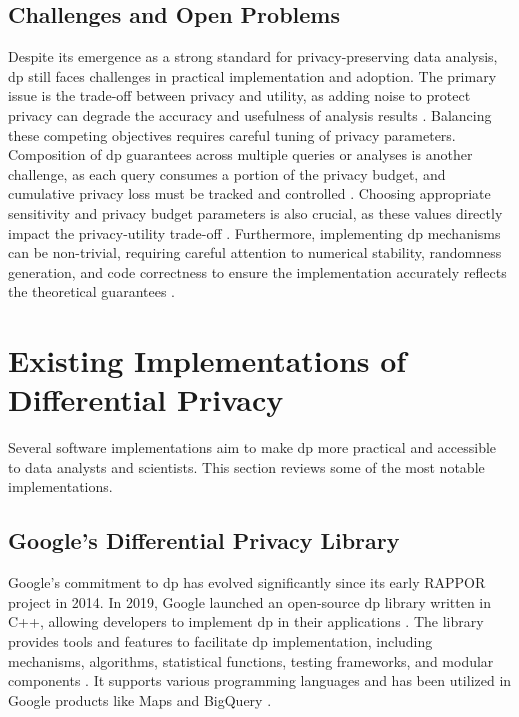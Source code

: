 \subsection{Challenges and Open Problems}
Despite its emergence as a strong standard for privacy-preserving data analysis, \acrshort{dp} still faces challenges in practical implementation and adoption. The primary issue is the trade-off between privacy and utility, as adding noise to protect privacy can degrade the accuracy and usefulness of analysis results \cite{Dwork2014}. Balancing these competing objectives requires careful tuning of privacy parameters. Composition of \acrshort{dp} guarantees across multiple queries or analyses is another challenge, as each query consumes a portion of the privacy budget, and cumulative privacy loss must be tracked and controlled \cite{mcsherry2007mechanism}. Choosing appropriate sensitivity and privacy budget parameters is also crucial, as these values directly impact the privacy-utility trade-off \cite{Dwork2006calibrating}. Furthermore, implementing \acrshort{dp} mechanisms can be non-trivial, requiring careful attention to numerical stability, randomness generation, and code correctness to ensure the implementation accurately reflects the theoretical guarantees \cite{Mironov2012}.

\section{Existing Implementations of Differential Privacy}
Several software implementations aim to make \acrshort{dp} more practical and accessible to data analysts and scientists. This section reviews some of the most notable implementations.

\subsection{Google's Differential Privacy Library}
Google's commitment to \acrshort{dp} has evolved significantly since its early RAPPOR project in 2014. In 2019, Google launched an open-source \acrshort{dp} library written in C++, allowing developers to implement \acrshort{dp} in their applications \cite{Guevara_2022,RAPPOR,wilson2019differentially}. The library provides tools and features to facilitate \acrshort{dp} implementation, including mechanisms, algorithms, statistical functions, testing frameworks, and modular components \cite{wilson2019differentially,wilson2020differentially,RAPPOR}. It supports various programming languages and has been utilized in Google products like Maps and BigQuery \cite{Google_BigQuery}.

